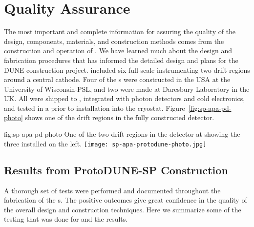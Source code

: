 \section{Quality Assurance}
\label{sec:fdsp-apa-qa}



The most important and complete information for assuring the quality of the  design, components, materials, and construction methods comes from the construction and operation of .  We have learned much about the design and fabrication procedures that has informed the detailed design and plans for the DUNE  construction project.  included six full-scale   instrumenting two drift regions around a central cathode.  Four of the  s were constructed in the USA at the University of Wisconsin-PSL, and two were made at Daresbury Laboratory in the UK. All were shipped to , integrated with photon detectors and cold electronics, and tested in a \coldbox prior to installation into the  cryostat.  Figure~\ref{fig:sp-apa-pd-photo} shows one of the drift regions in the fully constructed  detector.

\begin{dunefigure}{fig:sp-apa-pd-photo}
{One of the two drift regions in the  detector at  showing the three installed  on the left.}
\texttt{[image: sp-apa-protodune-photo.jpg]}
\end{dunefigure}


\subsection{Results from ProtoDUNE-SP Construction}
\label{sec:fdsp-apa-qa-protodune-const}

A thorough set of  tests were performed and documented throughout the fabrication of the  s.  The positive outcomes give great confidence in the quality of the overall  design  and construction techniques.  Here we summarize some of the testing that was done for  and the results.   

